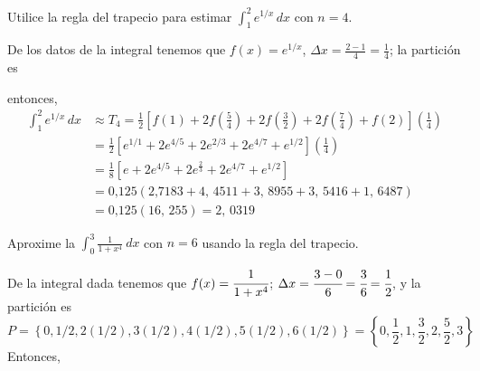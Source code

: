 \begin{ejemplo}
\textnormal{Utilice la regla del trapecio para estimar \textit{$\displaystyle\int_{1}^{2}e^{1/x}\,dx$} con \textit{$n=4.$}}
\end{ejemplo}

De los datos de la integral tenemos que $f(x)=e^{1/x}$, $\Delta x=\frac{2-1}{4}=\frac{1}{4}$; la partición es



entonces,
{\small
\begin{align*}
\int_{1}^{2}e^{1/x}\,dx&\approx T_4=\frac{1}{2}\left[ f(1)+2f\left(\frac{5}{4}\right)+2f\left(\frac{3}{2}\right)+2f\left(\frac{7}{4}\right)+f(2)\right] \left( \frac{1}{4}\right)\\
&=\frac{1}{2}\left[ e^{1/1}+2e^{4/5}+2e^{2/3}+2e^{4/7}+e^{1/2}\right] \left( \frac{1}{4}\right)\\
&=\frac{1}{8}\left[ e+2e^{4/5}+2e^{\frac{2}{3}
}+2e^{4/7}+e^{1/2}\right]\\
&=0\text{,}125(2\text{,}7183+4,\,\allowbreak
4511+3,\,\allowbreak 8955+3,\,\allowbreak 5416+1,\,\allowbreak 6487)\\
&=0\text{,}125(16,\,\allowbreak 255)=2,\,\allowbreak 0319
\end{align*}
}

\begin{ejemplo}
\textnormal{Aproxime la {\small \textit{$\displaystyle\int_{0}^{3}\frac{1}{1+x^{4}}\ dx$}} con \textit{$n=6$} usando la regla del trapecio.}
\end{ejemplo}

De la integral dada tenemos que {\small $f(x)=\cfrac{1}{1+x^{4}}$;} $\Delta x=\cfrac{3-0}{6}=\cfrac{3}{6}=\cfrac{1}{2}$, y la partición es
{\small
\[
P=\left\{0,1/2,2(1/2),3(1/2),4(1/2),5(1/2%
),6(1/2)\right\}=\left\{0,\frac{1}{2},1,\frac{3}{2},2,\frac{5}{2},3\right\}
\]
}
Entonces,

